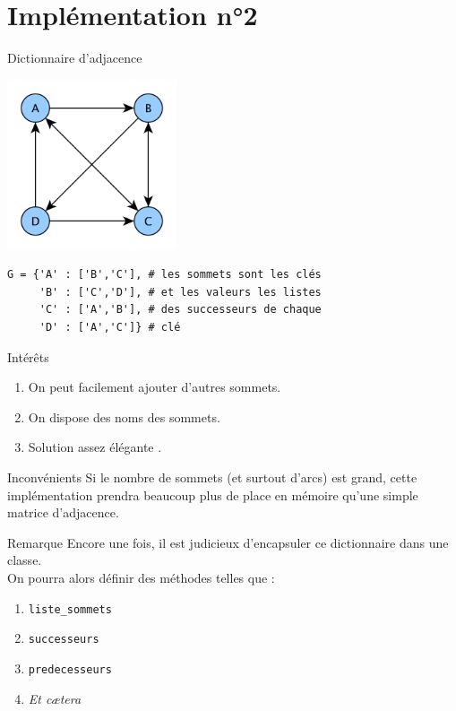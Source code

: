 \documentclass[10pt]{beamer}
\begin{document}
\section*{Implémentation n°2}
\begin{frame}[fragile]{Dictionnaire d'adjacence}
\begin{center}
	\includegraphics[width=5cm]{img/graphe_matrice}
\end{center}
\begin{verbatim}
G = {'A' : ['B','C'], # les sommets sont les clés
     'B' : ['C','D'], # et les valeurs les listes 
     'C' : ['A','B'], # des successeurs de chaque
     'D' : ['A','C']} # clé
\end{verbatim}
\end{frame}

\begin{frame}{Intérêts}
\begin{enumerate}[--]
    \item On peut facilement ajouter d'autres sommets.
    \item On dispose des noms des sommets.
    \item Solution assez \og élégante \fg.
\end{enumerate}
\end{frame}
\begin{frame}{Inconvénients}
    Si le nombre de sommets (et surtout d'arcs) est grand, cette implémentation prendra beaucoup plus de place en mémoire qu'une simple matrice d'adjacence.
\end{frame}

\begin{frame}{Remarque}
Encore une fois, il est judicieux d'encapsuler ce dictionnaire dans une classe.\\ 
On pourra alors définir des méthodes telles que :
\begin{enumerate}[--]
	\item 	\texttt{liste\_sommets}
	\item 	\texttt{successeurs}
    \item 	\texttt{predecesseurs}
    \item 	\textit{Et c\ae tera}
\end{enumerate}
\end{frame}
\end{document}
